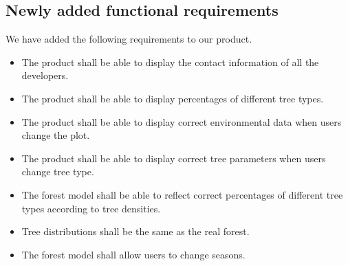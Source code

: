 \documentclass[12pt, titlepage]{article}
\begin{document}
\subsection{Newly added functional requirements}
We have added the following requirements to our product.
\begin{itemize}
\item The product shall be able to display the contact information of all the 
developers.
\item The product shall be able to display percentages of different tree types.
\item The product shall be able to display correct environmental data when users
change the plot.
\item The product shall be able to display correct tree parameters when users
change tree type.
\item The forest model shall be able to reflect correct percentages of different
tree types according to tree densities.
\item Tree distributions shall be the same as the real forest.
\item The forest model shall allow users to change seasons.
\end{itemize}
\end{document}
